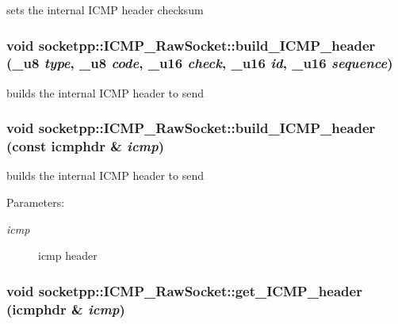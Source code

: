 sets the internal ICMP header checksum 

\hypertarget{classsocketpp_1_1ICMP__RawSocket_d97b59bf0442ecd08b3660cafd2a5a3f}{
\subsubsection[{build\_\-ICMP\_\-header}]{\setlength{\rightskip}{0pt plus 5cm}void socketpp::ICMP\_\-RawSocket::build\_\-ICMP\_\-header ({\bf \_\-u8} {\em type}, \/  {\bf \_\-u8} {\em code}, \/  {\bf \_\-u16} {\em check}, \/  {\bf \_\-u16} {\em id}, \/  {\bf \_\-u16} {\em sequence})}}
\label{classsocketpp_1_1ICMP__RawSocket_d97b59bf0442ecd08b3660cafd2a5a3f}


builds the internal ICMP header to send 

\hypertarget{classsocketpp_1_1ICMP__RawSocket_7d8d54d4771f4012246835819421fbeb}{
\subsubsection[{build\_\-ICMP\_\-header}]{\setlength{\rightskip}{0pt plus 5cm}void socketpp::ICMP\_\-RawSocket::build\_\-ICMP\_\-header (const {\bf icmphdr} \& {\em icmp})}}
\label{classsocketpp_1_1ICMP__RawSocket_7d8d54d4771f4012246835819421fbeb}


builds the internal ICMP header to send 

\begin{Desc}
\item[Parameters:]
\begin{description}
\item[{\em icmp}]icmp header \end{description}
\end{Desc}
\hypertarget{classsocketpp_1_1ICMP__RawSocket_9b0ed9bb87d2895f2302db13b7ca5f06}{
\subsubsection[{get\_\-ICMP\_\-header}]{\setlength{\rightskip}{0pt plus 5cm}void socketpp::ICMP\_\-RawSocket::get\_\-ICMP\_\-header ({\bf icmphdr} \& {\em icmp})}}
\label{classsocketpp_1_1ICMP__RawSocket_9b0ed9bb87d2895f2302db13b7ca5f06}


